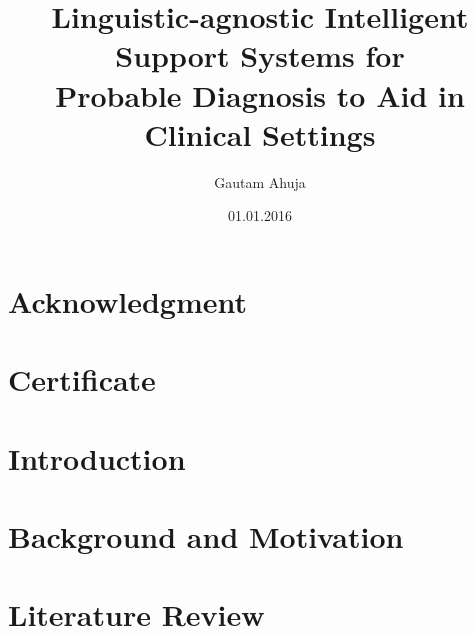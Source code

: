 \documentclass[%
]{tumDiss}
\title{%
  Linguistic-agnostic Intelligent Support Systems for\\
   Probable Diagnosis to Aid in Clinical Settings\\
}
\author{Gautam Ahuja}
\date{01.01.2016}
\begin{document}
\frontmatter
\maketitle


\chapter{Acknowledgment}



\chapter{Certificate}



% 


\tableofcontents
\listoffigures
\listoftables
\printglossary[type=\acronymtype, nonumberlist]


\mainmatter
\chapter{Introduction}
\label{chap:introduction}



\chapter{Background and Motivation}
\label{chap:bcgmot}



\chapter{Literature Review}
\label{chap:sota}



\end{document}
